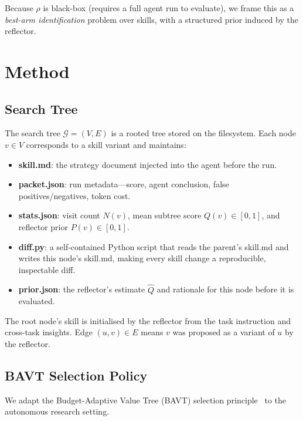 \documentclass{article}
\begin{document}
Because $\rho$ is black-box (requires a full agent run to evaluate), we frame this as a \emph{best-arm identification} problem over skills, with a structured prior induced by the reflector.

\section{Method}
\label{sec:method}

\subsection{Search Tree}

The search tree $\mathcal{G} = (V, E)$ is a rooted tree stored on the filesystem.
Each node $v \in V$ corresponds to a skill variant and maintains:
\begin{itemize}
    \item \textbf{skill.md}: the strategy document injected into the agent before the run.
    \item \textbf{packet.json}: run metadata---score, agent conclusion, false positives/negatives, token cost.
    \item \textbf{stats.json}: visit count $N(v)$, mean subtree score $Q(v) \in [0,1]$, and reflector prior $P(v) \in [0,1]$.
    \item \textbf{diff.py}: a self-contained Python script that reads the parent's skill.md and writes this node's skill.md, making every skill change a reproducible, inspectable diff.
    \item \textbf{prior.json}: the reflector's estimate $\hat{Q}$ and rationale for this node before it is evaluated.
\end{itemize}

The root node's skill is initialised by the reflector from the task instruction and cross-task insights.
Edge $(u, v) \in E$ means $v$ was proposed as a variant of $u$ by the reflector.

\subsection{BAVT Selection Policy}

We adapt the Budget-Adaptive Value Tree (BAVT) selection principle~\cite{bavt} to the autonomous research setting.
\end{document}
